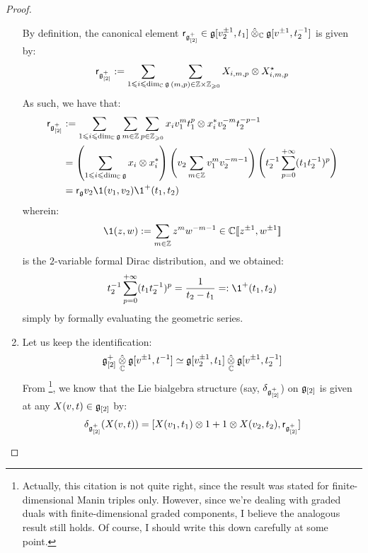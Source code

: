 \begin{proof}
\begin{enumerate}
                        By definition, the canonical element $\sfr_{\g_{[2]}^+} \in \g[v_2^{\pm 1}, t_1] \hattensor_{\bbC} \g[v^{\pm 1}, t_2^{-1}]$ is given by:
                            $$\sfr_{\g_{[2]}^+} := \sum_{1 \leq i \leq \dim_{\bbC} \g} \sum_{(m, p) \in \Z \x \Z_{\geq 0}} X_{i, m, p} \tensor X_{i, m, p}^{\star}$$
                        As such, we have that:
                            $$
                                \begin{aligned}
                                    \sfr_{\g_{[2]}^+} & := \sum_{1 \leq i \leq \dim_{\bbC} \g} \sum_{m \in \Z} \sum_{p \in \Z_{\geq 0}} x_i v_1^m t_1^p \tensor x_i^* v_2^{-m} t_2^{-p - 1}
                                    \\
                                    & = \left( \sum_{1 \leq i \leq \dim_{\bbC} \g} x_i \tensor x_i^* \right) \left( v_2 \sum_{m \in \Z} v_1^m v_2^{-m - 1} \right) \left( t_2^{-1} \sum_{p = 0}^{+\infty} (t_1 t_2^{-1})^p \right)
                                    \\
                                    & = \sfr_{\g} v_2 \1(v_1, v_2) \1^+(t_1, t_2)
                                \end{aligned}
                            $$
                        wherein:
                            $$\1(z, w) := \sum_{m \in \Z} z^m w^{-m - 1} \in \bbC[\![z^{\pm 1}, w^{\pm 1}]\!]$$ 
                        is the $2$-variable formal Dirac distribution, and we obtained:
                            $$t_2^{-1} \sum_{p = 0}^{+\infty} (t_1 t_2^{-1})^p = \frac{1}{t_2 - t_1} =: \1^+(t_1, t_2)$$
                        simply by formally evaluating the geometric series. 
                        \item Let us keep the identification:
                            $$\g_{[2]}^+ \hattensor_{\bbC} \g[v^{\pm 1}, t^{-1}] \cong \g[v_2^{\pm 1}, t_1] \hattensor_{\bbC} \g[v^{\pm 1}, t_2^{-1}]$$
                        From \cite[pp. 5]{etingof_kazhdan_quantisation_1}\footnote{Actually, this citation is not quite right, since the result was stated for finite-dimensional Manin triples only. However, since we're dealing with graded duals with finite-dimensional graded components, I believe the analogous result still holds. Of course, I should write this down carefully at some point.}, we know that the Lie bialgebra structure (say, $\delta_{\mathfrak{g}_{[2]}^+}$) on $\mathfrak{g}_{[2]}$ is given at any $X(v, t) \in \mathfrak{g}_{[2]}$ by:
                            $$\delta_{\g_{[2]}^+}( X(v, t) ) = [X(v_1, t_1) \tensor 1 + 1 \tensor X(v_2, t_2), \sfr_{\g_{[2]}^+}]$$

\end{enumerate}
\end{proof}
